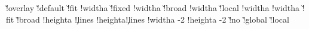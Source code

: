 {     \@@localoffset{}
   \else\ifx\localoffset\v!overlay
     \boxhasoffsetfalse
     \boxhasstrutfalse
     \boxisoverlaidtrue
     \@@localoffset\zeropoint
   \else
     \boxhasoffsettrue
     \boxhasstruttrue
     \boxisoverlaidfalse
     \ifx\localoffset\v!default %
       \let\localoffset\defaultframeoffset
     \else
       \let{}\localoffset
     \fi
     \@@localoffset\localoffset
     \advance\@@localoffset {}
   \fi\fi
   \ifx\localwidth\v!fit
     \ifboxhasformat
       \boxhaswidthtrue
       \!!widtha\hsize
     \else
       \boxhaswidthfalse
     \fi
   \else\ifx\localwidth\v!fixed %
     \ifboxhasformat
       \boxhaswidthtrue
       \!!widtha\hsize
     \else
       \boxhaswidthfalse
     \fi
   \else\ifx\localwidth\v!broad
     \boxhaswidthtrue
     \!!widtha\hsize
   \else\ifx\localwidth\v!local
     \boxhaswidthtrue
     \setlocalhsize
     \!!widtha\localhsize
   \else
     \boxhaswidthtrue
     \!!widtha\localwidth
   \fi\fi\fi\fi
   \ifx\localheight\v!fit
     \boxhasheightfalse %
   \else\ifx\localheight\v!broad
     \boxhasheightfalse
   \else
     \boxhasheighttrue
     \!!heighta\localheight
   \fi\fi
   \ifboxhasheight
   \else
       {\ifcase\framedparameter\c!lines\else
          \!!heighta\framedparameter\c!lines\lineheight
          \edef\localheight{\the\!!heighta}%
          \boxhasheighttrue
        \fi}%
   \fi
   \advance\!!widtha  -2\@@localoffset
   \advance\!!heighta -2\@@localoffset
   \ifx\localstrut\v!no
     \boxhasstrutfalse
   \else\ifx\localstrut\v!global
     \setstrut
   \else\ifx\localstrut\v!local
     \setfontstrut
   \fi\fi\fi
   \ifboxhasstrut
     \setstrut
     \let\localbegstrut\begstrut
     \let\localendstrut\endstrut
     \let\localstrut   \strut
   \else
     \let\localbegstrut\pseudobegstrut %
     \let\localendstrut\pseudoendstrut %
     \let\localstrut   \pseudostrut    %
}
